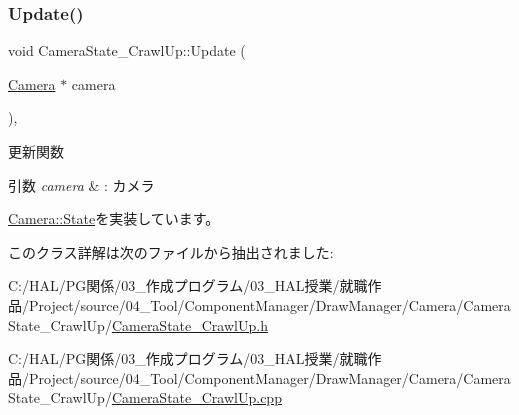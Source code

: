 \subsubsection{\texorpdfstring{Update()}{Update()}}
{\footnotesize\ttfamily void Camera\+State\+\_\+\+Crawl\+Up\+::\+Update (\begin{DoxyParamCaption}\item[{\mbox{\hyperlink{class_camera}{Camera}} $\ast$}]{camera }\end{DoxyParamCaption})\hspace{0.3cm}{\ttfamily [override]}, {\ttfamily [virtual]}}



更新関数 


\begin{DoxyParams}{引数}
{\em camera} & \+: カメラ \\
\hline
\end{DoxyParams}


\mbox{\hyperlink{class_camera_1_1_state_a2d41e0cb783666bae6c6ea167fcc7874}{Camera\+::\+State}}を実装しています。



このクラス詳解は次のファイルから抽出されました\+:\begin{DoxyCompactItemize}
\item 
C\+:/\+H\+A\+L/\+P\+G関係/03\+\_\+作成プログラム/03\+\_\+\+H\+A\+L授業/就職作品/\+Project/source/04\+\_\+\+Tool/\+Component\+Manager/\+Draw\+Manager/\+Camera/\+Camera\+State\+\_\+\+Crawl\+Up/\mbox{\hyperlink{_camera_state___crawl_up_8h}{Camera\+State\+\_\+\+Crawl\+Up.\+h}}\item 
C\+:/\+H\+A\+L/\+P\+G関係/03\+\_\+作成プログラム/03\+\_\+\+H\+A\+L授業/就職作品/\+Project/source/04\+\_\+\+Tool/\+Component\+Manager/\+Draw\+Manager/\+Camera/\+Camera\+State\+\_\+\+Crawl\+Up/\mbox{\hyperlink{_camera_state___crawl_up_8cpp}{Camera\+State\+\_\+\+Crawl\+Up.\+cpp}}\end{DoxyCompactItemize}
